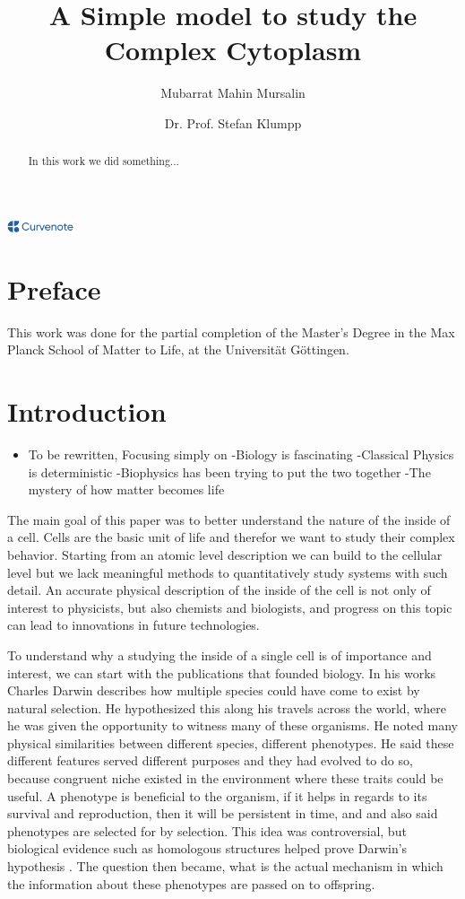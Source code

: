 \documentclass{article}
\title{A Simple model to study the Complex Cytoplasm}
\author{Mubarrat Mahin Mursalin \and Dr. Prof. Stefan Klumpp}
\date{\displaydate{articleDate}}
\newcommand{\logo}{
  \href{https://curvenote.com}{\includegraphics[width=2cm]{curvenote.png}}
}
\begin{document}
\maketitle
\begin{abstract}In this work we did something...\end{abstract}\begin{center}\logo\end{center}


\section{Preface}

This work was done for the partial completion of the Master's Degree in the Max Planck School of Matter to Life, at the Universität Göttingen.

\section{Introduction}

\begin{itemize}
\item To be rewritten, Focusing simply on\newline
-Biology is fascinating\newline
-Classical Physics is deterministic\newline
-Biophysics has been trying to put the two together\newline
-The mystery of how matter becomes life
\end{itemize}

The main goal of this paper was to better understand the nature of the inside of a cell. Cells are the basic unit of life and therefor we want to study their complex behavior. Starting from an atomic level description we can build to the cellular level but we lack meaningful methods to quantitatively study systems with such detail. An accurate physical description of the inside of the cell is not only of interest to physicists, but also chemists and biologists, and progress on this topic can lead to innovations in future technologies.

To understand why a studying the inside of a single cell is of importance and interest, we can start with the publications that founded biology. In his works  Charles Darwin describes how multiple species could have come to exist by natural selection. He hypothesized this along his travels across the world, where he was given the opportunity to witness many of these organisms. He noted many physical similarities between different species, different phenotypes. He said these different features served different purposes and they had evolved to do so, because congruent niche existed in the environment where these traits could be useful. A phenotype is beneficial to the organism, if it helps in regards to its survival and reproduction, then it will be persistent in time, and and also said phenotypes are selected for by selection. This idea was controversial, but biological evidence such as homologous structures helped prove Darwin's hypothesis . The question then became, what is the actual mechanism in which the information about these phenotypes are passed on to offspring.
\end{document}
